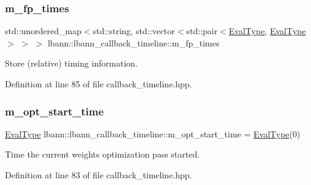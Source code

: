 \subsubsection{\texorpdfstring{m\+\_\+fp\+\_\+times}{m\_fp\_times}}
{\footnotesize\ttfamily std\+::unordered\+\_\+map$<$std\+::string, std\+::vector$<$std\+::pair$<$\hyperlink{base_8hpp_a3266f5ac18504bbadea983c109566867}{Eval\+Type}, \hyperlink{base_8hpp_a3266f5ac18504bbadea983c109566867}{Eval\+Type}$>$ $>$ $>$ lbann\+::lbann\+\_\+callback\+\_\+timeline\+::m\+\_\+fp\+\_\+times\hspace{0.3cm}{\ttfamily [private]}}



Store (relative) timing information. 



Definition at line 85 of file callback\+\_\+timeline.\+hpp.

\mbox{\label{classlbann_1_1lbann__callback__timeline_a9f16bbedce47953a28e63b52d92792c3}} 
\subsubsection{\texorpdfstring{m\+\_\+opt\+\_\+start\+\_\+time}{m\_opt\_start\_time}}
{\footnotesize\ttfamily \hyperlink{base_8hpp_a3266f5ac18504bbadea983c109566867}{Eval\+Type} lbann\+::lbann\+\_\+callback\+\_\+timeline\+::m\+\_\+opt\+\_\+start\+\_\+time = \hyperlink{base_8hpp_a3266f5ac18504bbadea983c109566867}{Eval\+Type}(0)\hspace{0.3cm}{\ttfamily [private]}}



Time the current weights\textquotesingle{} optimization pass started. 



Definition at line 83 of file callback\+\_\+timeline.\+hpp.

\mbox{\label{classlbann_1_1lbann__callback__timeline_abc57215e52823fe6f44f040f06f60847}} 
